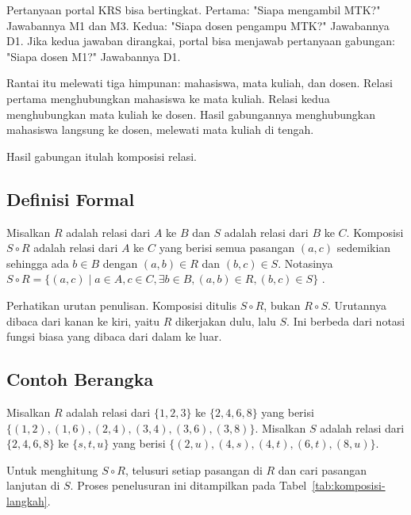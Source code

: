 \documentclass[11pt,a4paper]{article}
\begin{document}
Pertanyaan portal KRS bisa bertingkat. Pertama: "Siapa mengambil MTK?" Jawabannya M1 dan M3. Kedua: "Siapa dosen pengampu MTK?" Jawabannya D1. Jika kedua jawaban dirangkai, portal bisa menjawab pertanyaan gabungan: "Siapa dosen M1?" Jawabannya D1.

Rantai itu melewati tiga himpunan: mahasiswa, mata kuliah, dan dosen. Relasi pertama menghubungkan mahasiswa ke mata kuliah. Relasi kedua menghubungkan mata kuliah ke dosen. Hasil gabungannya menghubungkan mahasiswa langsung ke dosen, melewati mata kuliah di tengah.

Hasil gabungan itulah komposisi relasi.

\subsection{Definisi Formal}

Misalkan $R$ adalah relasi dari $A$ ke $B$ dan $S$ adalah relasi dari $B$ ke $C$. Komposisi $S \circ R$ adalah relasi dari $A$ ke $C$ yang berisi semua pasangan $(a,c)$ sedemikian sehingga ada $b \in B$ dengan $(a,b) \in R$ dan $(b,c) \in S$. Notasinya $S \circ R=\{(a,c) \mid a \in A, c \in C, \exists b \in B, (a,b) \in R, (b,c) \in S\}$ \cite{rosen}.

Perhatikan urutan penulisan. Komposisi ditulis $S \circ R$, bukan $R \circ S$. Urutannya dibaca dari kanan ke kiri, yaitu $R$ dikerjakan dulu, lalu $S$. Ini berbeda dari notasi fungsi biasa yang dibaca dari dalam ke luar.

\subsection{Contoh Berangka}

Misalkan $R$ adalah relasi dari $\{1,2,3\}$ ke $\{2,4,6,8\}$ yang berisi $\{(1,2),(1,6),(2,4),(3,4),(3,6),(3,8)\}$. Misalkan $S$ adalah relasi dari $\{2,4,6,8\}$ ke $\{s,t,u\}$ yang berisi $\{(2,u),(4,s),(4,t),(6,t),(8,u)\}$.

Untuk menghitung $S \circ R$, telusuri setiap pasangan di $R$ dan cari pasangan lanjutan di $S$. Proses penelusuran ini ditampilkan pada Tabel~\ref{tab:komposisi-langkah}.
\end{document}
